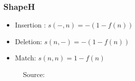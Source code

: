 \documentclass{beamer}
\begin{document}
	\begin{frame}
        \frametitle{ShapeH}
        \begin{minipage}{0.45\textwidth}
            \begin{itemize}
             \item Insertion : $ s(-, n) = -(1 - f(n))$
             \item Deletion: $s(n, -) = -(1 - f(n))$
             \item Match: $s(n, n) = 1 - f(n)$
            \end{itemize}
        \end{minipage}
        \begin{minipage}{0.45\textwidth}
        \begin{figure}[h!]
             \caption{Source: \cite{five_point_two}}
        \end{figure}
        \end{minipage}
	\end{frame}
	
\end{document}

